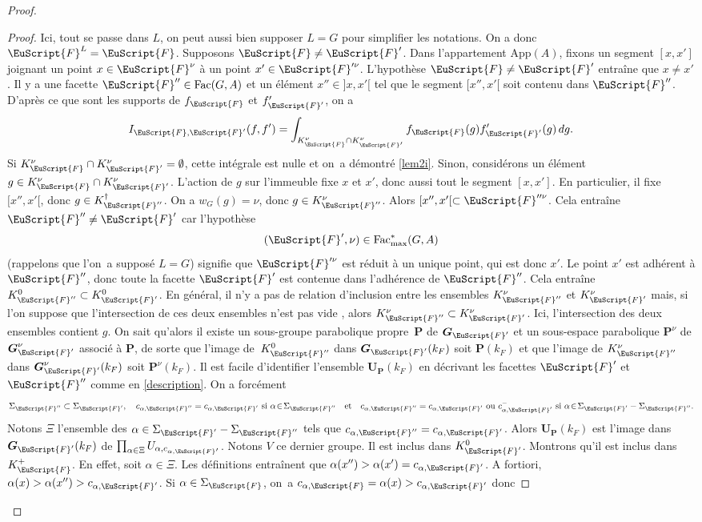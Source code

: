 \documentclass[JEP,XML,SOM,Unicode,francais]{cedram}
\let\mathcal \EuScript
\newcommand{\quadet}{\quad\text{et}\quad}
\newcommand{\App}{\mathrm{App}}
\newcommand{\Fac}{\mathrm{Fac}}
\newcommand{\bG}{\boldsymbol{G}}
\newcommand{\bP}{\boldsymbol{P}}
\newcommand{\bU}{\boldsymbol{U}}
\newcommand{\cF}{\mathcal{F}}
\theoremstyle{plain}
\theoremstyle{definition}
\begin{document}
\begin{proof}
\begin{proof}
Ici, tout se passe dans $L$, on peut aussi bien supposer $L=G$ pour simplifier les notations. On a donc $\cF^L=\cF$. Supposons $\cF\neq\cF'$. Dans l'appartement $\App(A)$, fixons
un segment $[x,x']$ joignant un point $x\in \cF^{\nu}$ à un point $x'\in \cF^{\prime\nu}$. L'hypothèse $\cF\neq\cF'$ entraîne que $x\neq x'$. Il y a une facette $\cF''\in \Fac(G,A)$ et un élément $x''\in{}]x,x'[$ tel que le segment $[x'',x'[$ soit contenu dans $\cF''$. D'après ce que sont les supports de $f_{\cF}$ et $f'_{\cF'}$, on a
\[
I_{\cF,\cF'}(f,f')=\int_{K_{\cF}^{\nu}\cap K_{\cF'}^{\nu}}f_{\cF}(g)f'_{\cF'}(g)\, dg.
\]
Si $K_{\cF}^{\nu}\cap K_{\cF'}^{\nu}=\emptyset$, cette intégrale est nulle et on~a démontré \eqref{lem2i}. Sinon, considérons un élément $g\in K_{\cF}^{\nu}\cap K_{\cF'}^{\nu}$. L'action de $g$ sur l'immeuble fixe $x$ et $x'$, donc aussi tout le segment $[x,x']$. En particulier, il fixe $[x'',x'[$, donc $g\in K_{\cF''}^{\dag}$. On a $w_{G}(g)=\nu$, donc $g\in K_{\cF''}^{\nu}$. Alors $[x'',x'[\subset \cF^{\prime\prime\nu}$. Cela entraîne $\cF''\neq\cF'$ car l'hypothèse
\[
(\cF',\nu)\in \Fac^*_{\max}(G,A)
\]
(rappelons que l'on~a supposé $L=G$) signifie que $\cF^{\prime\nu}$ est réduit à un unique point, qui est donc $x'$. Le point $x'$ est adhérent à $\cF''$, donc toute la facette $\cF'$ est contenue dans l'adhérence de $\cF''$. Cela entraîne $K_{\cF''}^0\subset K_{\cF'}^0$. En général, il n'y a pas de relation d'inclusion entre les ensembles $K_{\cF''}^{\nu}$ et $K_{\cF'}^{\nu}$ mais, si l'on suppose que l'intersection de ces deux ensembles n'est pas vide , alors $K_{\cF''}^{\nu}\subset K_{\cF'}^{\nu}$. Ici, l'intersection des deux ensembles contient $g$.
On sait qu'alors il existe un sous-groupe parabolique propre~$\bP$ de $\bG_{\cF'}$ et un sous-espace parabolique $\bP^{\nu}$ de $\bG_{\cF'}^{\nu}$ associé à $\bP$, de sorte que l'image de~$K_{\cF''}^{0}$ dans $\bG_{\cF'}(k_{F})$ soit $\bP(k_{F})$ et que l'image de $K_{\cF''}^{\nu} $ dans $\bG_{\cF'}^{\nu}(k_{F})$ soit $\bP^{\nu}(k_{F})$. Il est facile d'identifier l'ensemble $\bU_{\bP}(k_{F})$ en décrivant les facettes $\cF'$ et $\cF''$ comme en \ref{description}. On a forcément
\[
\Sigma_{\cF''}\subset \Sigma_{\cF'},\quad c_{\alpha,\cF''}=c_{\alpha,\cF'}\text{ si }\alpha\!\in\!\Sigma_{\cF''}\quadet c_{\alpha,\cF''}=c_{\alpha,\cF'}\text{ ou }c_{\alpha,\cF'}^-\text{ si }\alpha\!\in\!\Sigma_{\cF'}-\Sigma_{\cF''}.
\]
Notons $\Xi$ l'ensemble des $\alpha\in \Sigma_{\cF'}-\Sigma_{\cF''}$ tels que $c_{\alpha,\cF''}=c_{\alpha,\cF'}$. Alors $\bU_{\bP}(k_{F})$ est l'image dans $\bG_{\cF'}(k_{F})$ de $\prod_{\alpha\in \Xi}U_{\alpha,c_{\alpha,\cF'}}$. Notons $V$ ce dernier groupe. Il est inclus dans $K_{\cF'}^0$. Montrons qu'il est inclus dans $K_{\cF}^+$. En effet, soit $\alpha\in \Xi$. Les définitions entraînent que $\alpha(x'')> \alpha(x')=c_{\alpha,\cF'}$. A fortiori, $\alpha(x)> \alpha(x'')> c_{\alpha,\cF'}$. Si $\alpha\in \Sigma_{\cF}$, on~a $c_{\alpha,\cF}=\alpha(x)> c_{\alpha,\cF'}$ donc

\end{proof}
\end{proof}
\end{document}
